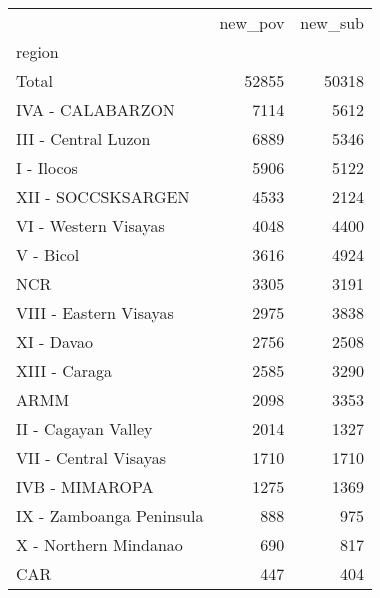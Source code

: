 \begin{tabular}{lrr}
\toprule
{} &  new\_pov &  new\_sub \\
region                   &          &          \\
\midrule
Total                    &    52855 &    50318 \\
IVA - CALABARZON         &     7114 &     5612 \\
III - Central Luzon      &     6889 &     5346 \\
I - Ilocos               &     5906 &     5122 \\
XII - SOCCSKSARGEN       &     4533 &     2124 \\
VI - Western Visayas     &     4048 &     4400 \\
V - Bicol                &     3616 &     4924 \\
NCR                      &     3305 &     3191 \\
VIII - Eastern Visayas   &     2975 &     3838 \\
XI - Davao               &     2756 &     2508 \\
XIII - Caraga            &     2585 &     3290 \\
ARMM                     &     2098 &     3353 \\
II - Cagayan Valley      &     2014 &     1327 \\
VII - Central Visayas    &     1710 &     1710 \\
IVB - MIMAROPA           &     1275 &     1369 \\
IX - Zamboanga Peninsula &      888 &      975 \\
X - Northern Mindanao    &      690 &      817 \\
CAR                      &      447 &      404 \\
\bottomrule
\end{tabular}
